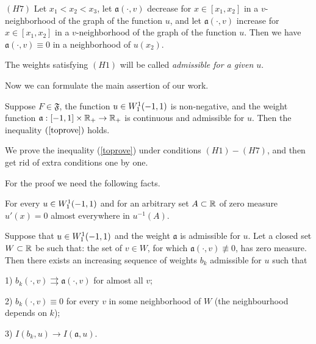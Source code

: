 \bigskip
\noindent
$(H7)$ Let $x_1 < x_2 < x_3$,
let $\mathfrak a(\cdot, v)$ decrease for $x \in [x_1, x_2]$ in a $v$-neighborhood of the graph of the function $u$,
and let $\mathfrak a(\cdot, v)$ increase for $x \in [x_1, x_2]$ in a $v$-neighborhood of the graph of the function $u$.
Then we have $\mathfrak a(\cdot, v) \equiv 0$ in a neighborhood of $u(x_2)$.

\bigskip

The weights satisfying $(H1)$ will be called {\it admissible for a given $u$}.

Now we can formulate the main assertion of our work.
\begin{thm}
\label{mainThm}
Suppose $F \in \mathfrak{F}$, the function $u \in W_1^1(-1, 1)$ is non-negative,
and the weight function $\mathfrak a: [-1, 1] \times \mathbb R_+ \to \mathbb R_+$ is continuous
and admissible for $u$.
Then the inequality $(\ref{toprove})$ holds.
\end{thm}

We prove the inequality (\ref{toprove}) under conditions $(H1)-(H7)$,
and then get rid of extra conditions one by one.

For the proof we need the following facts.

\begin{prop}
\label{levelDerivative}
{\rm \cite[Theorem 6.19]{LL} }
For every $u \in W_1^1(-1, 1)$ and for an arbitrary set $A \subset \mathbb R$ of zero measure
$u'(x) = 0$ almost everywhere in $u^{-1}(A)$.
\end{prop}

\begin{lm}
\label{zeroApprox}
Suppose that $u \in W_1^1(-1, 1)$ and the weight $\mathfrak a$ is admissible for $u$.
Let a closed set $W \subset \mathbb R$ be such that:
the set of $v \in W$, for which $\mathfrak a(\cdot, v) \not\equiv 0$, has zero measure.
Then there exists an increasing sequence of weights $b_k$ admissible for $u$ such that

1) $b_k(\cdot, v) \rightrightarrows \mathfrak a(\cdot, v)$ for almost all $v$;

2) $b_k(\cdot, v) \equiv 0$ for every $v$ in some neighborhood of $W$ (the neighbourhood depends on $k$);

3) $I(b_k, u) \to I(\mathfrak a, u)$.
\end{lm}

